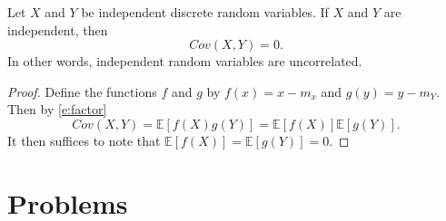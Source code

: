 \begin{corollary}
Let $X$ and $Y$ be independent discrete random variables. If $X$ and $Y$ are independent, then 
$$
Cov(X,Y) = 0. 
$$
In other words, independent random variables are uncorrelated.
\end{corollary}

\begin{proof}
Define the functions $f$ and $g$ by $f(x) = x - m_x$ and $g(y) = y- m_Y$. Then by \eqref{e:factor}
$$
Cov(X,Y) = \mathbb E[f(X)g(Y)] = \mathbb E[f(X)]\mathbb E[g(Y)].
$$
It then suffices to note that $\mathbb E[f(X)] = \mathbb E[g(Y)] = 0$. 
\end{proof}

%

\section{Problems}


